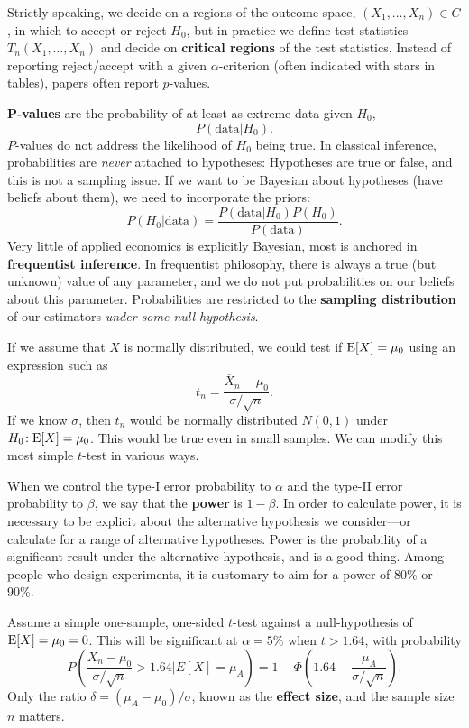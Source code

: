 \documentclass[10pt]{article}
\begin{document}
Strictly speaking, we decide on a regions of the outcome space, $(X_1,\dots,X_n)\in C$, in which to
accept or reject $H_0$, but in practice we define test-statistics
$T_n(X_1,\dots,X_n)$ and decide on \textbf{critical regions} of the test statistics. Instead of
reporting reject/accept with a given $\alpha$-criterion (often indicated
with stars in tables), papers often report
$p$-values. 

\textbf{P-values} are the probability of at least as extreme data given $H_0$,
\[ P( \text{data}| H_0).\]
$P$-values do not address the likelihood of $H_0$ being true.
In classical inference, probabilities are \emph{never} attached to hypotheses: Hypotheses are true 
or false, and this is not a sampling issue.
If we want to be Bayesian about hypotheses (have beliefs about them), we need to incorporate the priors: 
\[ P(H_0|\text{data}) = \frac{ P(\text{data}|H_0) P(H_0)}{ P(\text{data}) }. \]
Very little of applied economics is explicitly Bayesian, most is anchored in
\textbf{frequentist inference}. In frequentist philosophy, there is always a
true (but unknown) value of any parameter, and we do not put probabilities on
our beliefs about this parameter. Probabilities are restricted to the
\textbf{sampling distribution} of our estimators \emph{under some null
hypothesis}.

If we assume that $X$ is normally distributed, we could 
test if $\operatorname{E}[X] = \mu_0$ using an expression such as
\[
t_n = \frac{\overline{X}_n - \mu_0}{\sigma/\sqrt{n}}.
\]
If we know $\sigma$, then $t_n$ would be normally distributed $N(0,1)$ under $H_0\!: \operatorname{E}[X]=\mu_0$. 
This would be true even in small samples.
We can modify this most simple $t$-test in various ways.


When we control the type-I error probability to $\alpha$ and the type-II error probability
to $\beta$, we say that the \textbf{power} is $1-\beta$. 
In order to calculate power, it is necessary to be explicit about the alternative hypothesis 
we consider---or calculate for a range of alternative hypotheses. 
Power is the probability of a significant result under the alternative hypothesis, and is a good thing. 
Among people who design experiments, it is customary to aim for a power of 80\% or 90\%.

Assume a simple one-sample, one-sided $t$-test against a null-hypothesis of $\operatorname{E}[X]=\mu_0=0$. This will
be significant at $\alpha=5\%$ when $t> 1.64$, with probability
\[
P\left( \frac{\overline{X}_n - \mu_0}{\sigma/\sqrt{n}} > 1.64 | E[X]=\mu_A\right) = 
1 - \Phi\left( 1.64 - \frac{\mu_A}{\sigma/\sqrt{n}}\right).
\]
Only the ratio $\delta=(\mu_A-\mu_0)/\sigma$, known as the \textbf{effect size}, and the sample
size $n$ matters.
\end{document}
